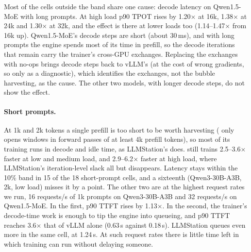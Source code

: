 Most of the cells outside the band share one cause: decode latency on
Qwen1.5-MoE with long prompts. At high load p90 \ac{TPOT} rises by
1.20$\times$ at 16k, 1.38$\times$ at 24k and 1.30$\times$ at 32k, and the
effect is there at lower loads too (1.14--1.47$\times$ from 16k up).
Qwen1.5-MoE's decode steps are short (about 30\,ms), and with long prompts
the engine spends most of its time in prefill, so the decode iterations that
remain carry the trainer's cross-GPU exchanges. Replacing the exchanges with
no-ops brings decode steps back to vLLM's (at the cost of wrong gradients, so
only as a diagnostic), which identifies the exchanges, not the bubble
harvesting, as the cause. The other two models, with longer decode steps,
do not show the effect.

\paragraph{Short prompts.}
At 1k and 2k tokens a single prefill is too short to be worth harvesting
(\sys{} only opens windows in forward passes of at least 4k prefill tokens),
so most of its training runs in decode and idle time, as LLMStation's does.
\sys{} still trains 2.5--3.6$\times$ faster at low and medium load, and
2.9--6.2$\times$ faster at high load, where LLMStation's iteration-level
slack all but disappears. Latency stays within the 10\% band in 15 of the
18 short-prompt cells, and a sixteenth (Qwen3-30B-A3B, 2k, low load) misses
it by a point. The other two are at the highest request rates we
run, 16 requests/s of 1k prompts on Qwen3-30B-A3B and 32 requests/s on
Qwen1.5-MoE. In the first, p90 \ac{TTFT} rises by 1.13$\times$. In the
second, the trainer's decode-time work is enough to tip the engine into
queueing, and p90 \ac{TTFT} reaches 3.6$\times$ that of vLLM alone (0.63\,s
against 0.18\,s). LLMStation queues even more in the same cell, at
1.24\,s. At such request rates there is little time left in which training
can run without delaying someone.

